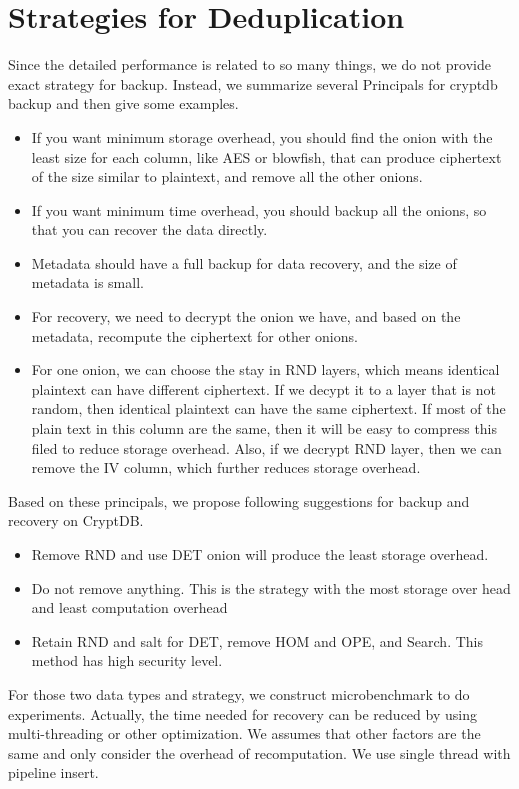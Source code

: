 \section{Strategies for Deduplication}
Since the detailed performance is related to so many things, we do not provide exact strategy for backup. Instead, we summarize several Principals for cryptdb backup and then give some examples. 

\begin{itemize}
\item If you want minimum storage overhead, you should find the onion with the least size for each column, like AES or blowfish, that can produce ciphertext of the size similar to plaintext, and remove all the other onions. 
\item If you want minimum time overhead, you should backup all the onions, so that you can recover the data directly.
\item Metadata should have a full backup for data recovery, and the size of metadata is small. 
\item For recovery, we need to decrypt the onion we have, and based on the metadata, recompute the ciphertext for other onions.
\item For one onion, we can choose the stay in RND layers, which means identical plaintext can have different ciphertext. If we decypt it to a layer that is not random, then identical plaintext can have the same ciphertext. If most of the plain text in this column are the same, then it will be easy to compress this filed to reduce storage overhead. Also, if we decrypt RND layer, then we can remove the IV column, which further reduces storage overhead.
\end{itemize}


Based on these principals, we propose following suggestions for backup and recovery on CryptDB. 

\begin{itemize}
\item Remove RND and use DET onion will produce the least storage overhead.
\item Do not remove anything. This is the strategy with the most storage over head and least computation overhead
\item Retain RND and salt for DET, remove HOM and OPE, and Search. This method has high security level.
\end{itemize}

For those two data types and strategy, we construct microbenchmark to do experiments. Actually, the time needed for recovery can be reduced by using multi-threading or other optimization. We assumes that other factors are the same and only consider the overhead of recomputation. We use single thread with pipeline insert.

